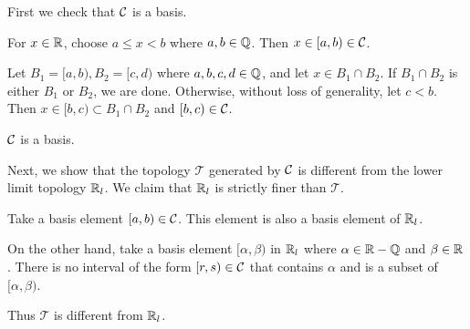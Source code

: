 \documentclass[a4paper,11pt]{article}
\newcommand{\T}{\mathcal{T}}
\begin{document}
\begin{minipage}[t][260mm]{90mm}
    \phantom{?}{\bfseries \large \#1.(b)} First we check that \(\mathcal{C}\) is a basis.

    For \(x \in \mathbb{R}\), choose \(a \leq x < b\) where \(a, b \in \mathbb{Q}\). Then \(x \in [a, b) \in \mathcal{C}\).

    Let \(B_1 = [a, b), B_2 = [c, d)\) where \(a, b, c, d \in \mathbb{Q}\), and let \(x \in B_1 \cap B_2\). If \(B_1 \cap B_2\) is either \(B_1\) or \(B_2\), we are done. Otherwise, without loss of generality, let \(c < b\). Then \(x \in [b, c) \subset B_1\cap B_2\) and \([b, c) \in \mathcal{C}\).

    \(\mathcal{C}\) is a basis.

    Next, we show that the topology \(\T\) generated by \(\mathcal{C}\) is different from the lower limit topology \(\mathbb{R}_l\). We claim that \(\mathbb{R}_l\) is strictly finer than \(\T\).

    Take a basis element \([a, b) \in \mathcal{C}\). This element is also a basis element of \(\mathbb{R}_l\).

    On the other hand, take a basis element \([\alpha, \beta)\) in \(\mathbb{R}_l\) where \(\alpha \in \mathbb{R} - \mathbb{Q}\) and \(\beta \in \mathbb{R}\). There is no interval of the form \([r, s) \in \mathcal{C}\) that contains \(\alpha\) and is a subset of \([\alpha, \beta)\).

    Thus \(\T\) is different from \(\mathbb{R}_l\).
\end{minipage}

\newpage

\phantom{?}
\vspace{5mm}
\end{document}
